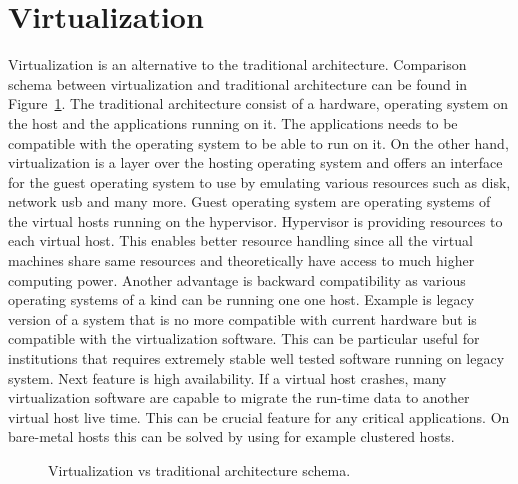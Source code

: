 \section{Virtualization}
Virtualization is an alternative to the traditional architecture. Comparison schema between virtualization and traditional architecture can be found in  Figure~\ref{fig:virtschema}. The traditional architecture consist of a hardware, operating system on the host and the applications running on it. The applications needs to be compatible with the operating system to be able to run on it. On the other hand, virtualization is a layer over the hosting operating system and offers an interface for the guest operating system to use by emulating various resources such as disk, network usb and many more. Guest operating system are operating systems of the virtual hosts running on the hypervisor. Hypervisor is providing resources to each virtual host. This enables better resource handling since all the virtual machines share same resources and theoretically have access to much higher computing power. Another advantage is backward compatibility as various operating systems of a kind can be running one one host. Example is legacy version of a system that is no more compatible with current hardware but is compatible with the virtualization software. This can be particular useful for institutions that requires extremely stable well tested software running on legacy system. Next feature is high availability. If a virtual host crashes, many virtualization software are capable to migrate the run-time data to another virtual host live time. This can be crucial feature for any critical applications. On bare-metal hosts this can be solved by using for example clustered hosts.\\

\begin{figure}[H]
	\centering
	\caption{Virtualization vs traditional architecture schema.}
	\label{fig:virtschema}
\end{figure}

